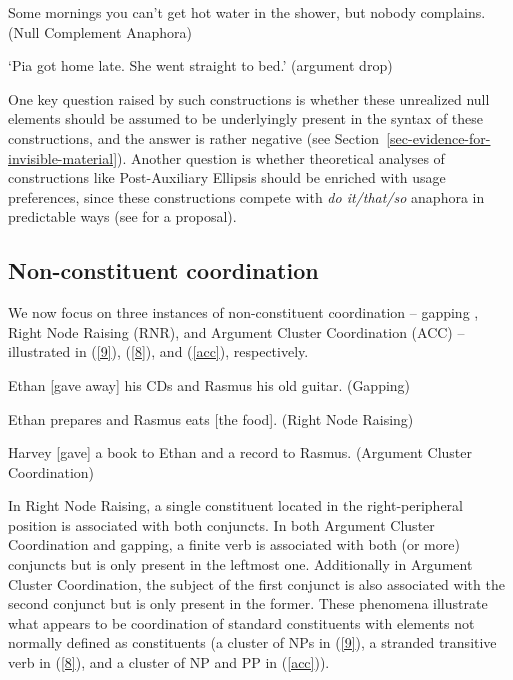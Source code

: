 \ea Some mornings you can't get hot water in the shower, but nobody complains. (Null Complement Anaphora) \label{6} \z

\ea
{}
\glt `Pia got home late. She went straight to bed.'
(argument drop) \label{7}
\z
%

One key question raised by such constructions
 is whether these unrealized null elements should be assumed to be underlyingly present in the
 syntax of these constructions, and the answer is rather negative (see
 Section~\ref{sec-evidence-for-invisible-material}). Another question is whether theoretical
 analyses of constructions like Post-Auxiliary Ellipsis should be enriched with usage preferences,
 since these constructions compete with \textit{do it/that/so} anaphora in predictable ways (see
 \citealt{Miller2013a} for a proposal).

\subsection{Non-constituent coordination}

We now focus on three instances of non-constituent coordination -- gapping \citep[171]{Ross1967}, Right Node Raising (RNR), and Argument Cluster Coordination (ACC) -- illustrated in (\ref{9}), (\ref{8}), and (\ref{acc}), respectively.

 \ea Ethan [gave away] his CDs and Rasmus his old guitar. (Gapping)\label{9}\z

 \ea %
 Ethan prepares and Rasmus eats [the food]. (Right Node Raising)
 \label{8}\z

\eanoraggedright
Harvey [gave] a book to Ethan and a record to Rasmus. (Argument Cluster Coordination) \label{acc}
\z

\noindent 
In Right Node Raising, a single constituent located in the right-peripheral position is associated with both conjuncts. In both Argument Cluster Coordination and gapping, a finite verb is associated with both (or more) conjuncts but is only present in the leftmost one. Additionally in Argument Cluster Coordination, the subject of the first conjunct is also associated with the second conjunct but is only present in the former. These phenomena illustrate what appears to be coordination of standard constituents with elements not normally defined as constituents (a cluster of NPs in (\ref{9}), a stranded transitive verb in (\ref{8}), and a cluster of NP and PP in (\ref{acc})).
%


